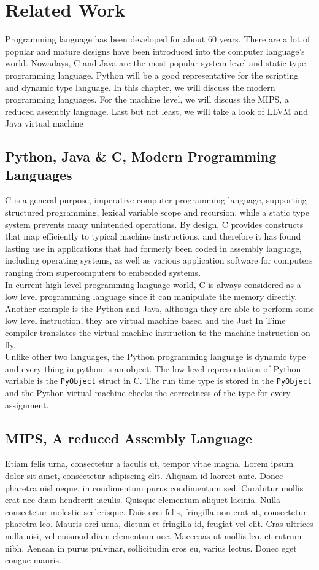 \chapter{Related Work}
Programming language has been developed for about 60 years. There are a lot of popular and mature designs have been introduced into the computer language's world. Nowadays, C and Java are the most popular system level and static type programming language. Python will be a good representative for the scripting and dynamic type language. In this chapter, we will discuss the modern programming languages. For the machine level, we will discuss the MIPS, a reduced assembly language. Last but not least, we will take a look of LLVM and Java virtual machine

\section{Python, Java \& C, Modern Programming Languages}
C is a general-purpose, imperative computer programming language, supporting structured programming, lexical variable scope and recursion, while a static type system prevents many unintended operations. By design, C provides constructs that map efficiently to typical machine instructions, and therefore it has found lasting use in applications that had formerly been coded in assembly language, including operating systems, as well as various application software for computers ranging from supercomputers to embedded systems. \\
In current high level programming language world, C is always considered as a low level programming language since it can manipulate the memory directly. Another example is the Python and Java, although they are able to perform some low level instruction, they are virtual machine based and the Just In Time compiler translates the virtual machine instruction to the machine instruction on fly. \\
Unlike other two languages, the Python programming language is dynamic type and every thing in python is an object. The low level representation of Python variable is the \texttt{PyObject} struct in C. The run time type is stored in the \texttt{PyObject} and the Python virtual machine checks the correctness of the type for every assignment.

\section{MIPS, A reduced Assembly Language}
Etiam felis urna, consectetur a iaculis ut, tempor vitae magna. Lorem ipsum dolor sit amet, consectetur adipiscing elit. Aliquam id laoreet ante. Donec pharetra nisl neque, in condimentum purus condimentum sed. Curabitur mollis erat nec diam hendrerit iaculis. Quisque elementum aliquet lacinia. Nulla consectetur molestie scelerisque. Duis orci felis, fringilla non erat at, consectetur pharetra leo. Mauris orci urna, dictum et fringilla id, feugiat vel elit. Cras ultrices nulla nisi, vel euismod diam elementum nec. Maecenas ut mollis leo, et rutrum nibh. Aenean in purus pulvinar, sollicitudin eros eu, varius lectus. Donec eget congue mauris.


